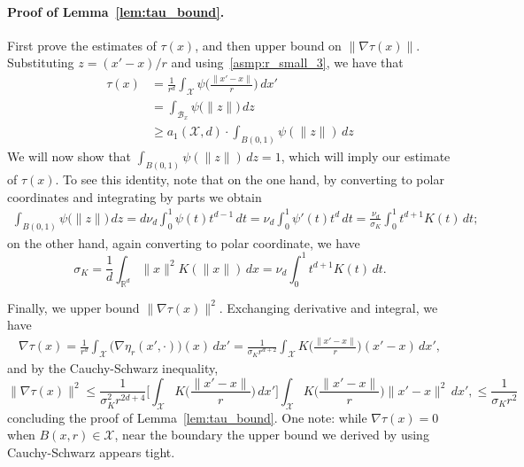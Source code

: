 \documentclass[twoside]{article}
\newcommand{\Reals}{\mathbb{R}}
\newcommand{\1}{\mathbf{1}}
\newcommand{\Xset}{\mathcal{X}}
\newcommand{\mc}[1]{\mathcal{#1}}
\theoremstyle{definition}
\theoremstyle{remark}
\begin{document}
\paragraph{Proof of Lemma~\ref{lem:tau_bound}.}
First prove the estimates of $\tau(x)$, and then upper bound on $\|\nabla\tau(x)\|$. Substituting $z = (x' - x)/r$ and using~\ref{asmp:r_small_3}, we have that
\begin{align*}
\tau(x) & = \frac{1}{r^d} \int_{\Xset} \psi\biggl(\frac{\|x' - x\|}{r}\biggr) \,dx' \\
& =  \int_{\mc{B}_x} \psi\bigl(\|z\|\bigr) \,dz \\
& \geq a_1(\Xset,d) \cdot \int_{B(0,1)} \psi(\|z\|) \,dz
\end{align*}
We will now show that $\int_{B(0,1)} \psi(\|z\|) \,dz = 1$, which will imply our estimate of $\tau(x)$. To see this identity, note that on the one hand, by converting to polar coordinates and integrating by parts we obtain
\begin{align*}
\int_{B(0,1)} \psi\bigl(\|z\|\bigr) \,dz = d \nu_d \int_{0}^{1} \psi(t) t^{d - 1} \,dt = \nu_d \int_{0}^{1} \psi'(t) t^{d} \,dt = \frac{\nu_d}{\sigma_K} \int_{0}^{1} t^{d + 1} K(t) \,dt;
\end{align*}
on the other hand, again converting to polar coordinate, we have
\begin{equation*}
\sigma_K = \frac{1}{d} \int_{\Reals^d} \|x\|^2 K(\|x\|) \,dx = \nu_d \int_{0}^{1}t^{d + 1} K(t) \,dt.
\end{equation*}

Finally, we upper bound $\|\nabla\tau(x)\|^2$. Exchanging derivative and integral, we have
\begin{align*}
\nabla\tau(x) = \frac{1}{r^d} \int_{\Xset} \bigl(\nabla \eta_r(x',\cdot)\bigr)(x) \,dx' = \frac{1}{\sigma_K r^{d + 2}} \int_{\Xset} K\biggl(\frac{\|x' - x\|}{r}\biggr)(x' - x)\,dx',
\end{align*}
and by the Cauchy-Schwarz inequality,
\begin{equation*}
\|\nabla\tau(x)\|^2 \leq \frac{1}{\sigma_K^2 r^{2d + 4}} \biggl[\int_{\Xset} K\biggl(\frac{\|x' - x\|}{r}\biggr)\,dx'\biggr] \int_{\Xset} K\biggl(\frac{\|x' - x\|}{r}\biggr)\|x' - x\|^2\,dx', \leq \frac{1}{\sigma_K r^{2}}
\end{equation*}
concluding the proof of Lemma~\ref{lem:tau_bound}. One note: while $\nabla\tau(x) = 0$ when $B(x,r) \in \Xset$, near the boundary the upper bound we derived by using Cauchy-Schwarz appears tight. 
\end{document}
